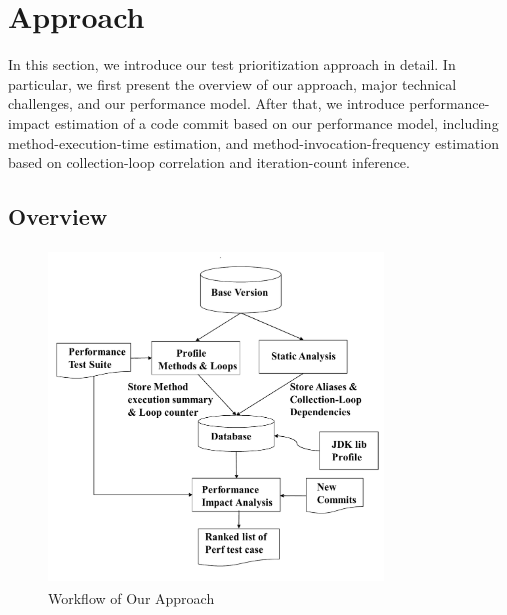 \section{Approach}
\label{sec:approach}

In this section, we introduce our test prioritization approach in detail. In particular, we first present the overview of our approach, major technical challenges, and our performance model. After that, we introduce performance-impact estimation of a code commit based on our performance model, including method-execution-time estimation, and method-invocation-frequency estimation based on collection-loop correlation and iteration-count inference.


\subsection{Overview}



\begin{figure}
\centering
	
	\includegraphics[width=3.5in, height=3.5in]{performance/images/Workflow2.pdf}
	\caption{Workflow of Our Approach}	
	\label{fig:approach-workflow}
		
\end{figure}

